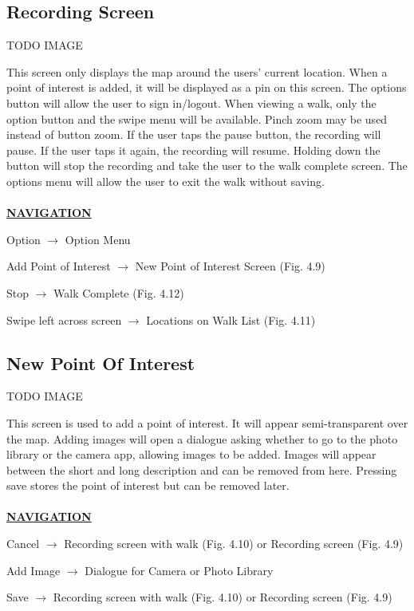 \documentclass[12pt]{article}
\begin{document}
\subsection{Recording Screen}
\par{TODO IMAGE}
\par{This screen only displays the map around the users’ current location. When a point of interest is added, it will be displayed as a pin on this screen. The options button will allow the user to sign in/logout. When viewing a walk, only the option button and the swipe menu will be available. Pinch zoom may be used instead of button zoom. If the user taps the pause button, the recording will pause. If the user taps it again, the recording will resume. Holding down the button will stop the recording and take the user to the walk complete screen. The options menu will allow the user to exit the walk without saving. \\ \\}
\textbf{\uline{NAVIGATION}}
\par{Option $\rightarrow$ Option Menu}
\par{Add Point of Interest $\rightarrow$ New Point of Interest Screen (Fig. 4.9)}
\par{Stop $\rightarrow$ Walk Complete (Fig. 4.12)}
\par{Swipe left across screen $\rightarrow$ Locations on Walk List (Fig. 4.11)}
\subsection{New Point Of Interest}
\par{TODO IMAGE}
\par{This screen is used to add a point of interest. It will appear semi-transparent over the map. Adding images will open a dialogue asking whether to go to the photo library or the camera app, allowing images to be added. Images will appear between the short and long description and can be removed from here. Pressing save stores the point of interest but can be removed later. \\ \\}
\textbf{\uline{NAVIGATION}}
\par{Cancel $\rightarrow$ Recording screen with walk (Fig. 4.10) or Recording screen (Fig. 4.9)}
\par{Add Image $\rightarrow$ Dialogue for Camera or Photo Library}
\par{Save $\rightarrow$ Recording screen with walk (Fig. 4.10) or Recording screen (Fig. 4.9)}
\end{document}
